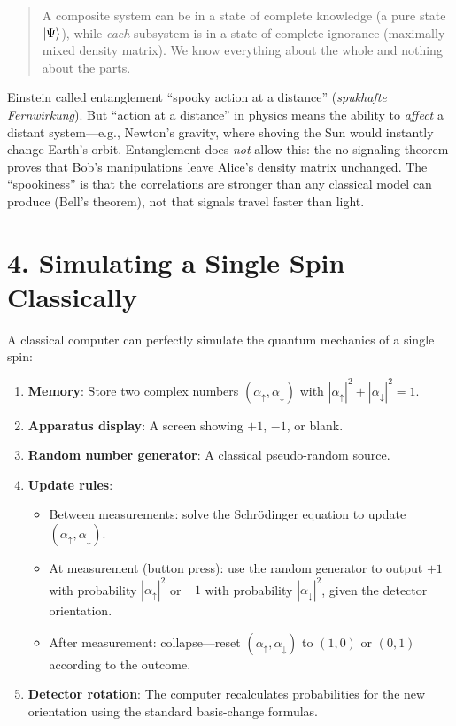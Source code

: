 \documentclass[12pt,a4paper]{article}
\begin{document}
\begin{quote}
A composite system can be in a state of complete knowledge (a pure state $\ket{\Psi}$), while \emph{each} subsystem is in a state of complete ignorance (maximally mixed density matrix).  We know everything about the whole and nothing about the parts.
\end{quote}

Einstein called entanglement ``spooky action at a distance'' (\textit{spukhafte Fernwirkung}).  But ``action at a distance'' in physics means the ability to \emph{affect} a distant system---e.g., Newton's gravity, where shoving the Sun would instantly change Earth's orbit.  Entanglement does \emph{not} allow this: the no-signaling theorem proves that Bob's manipulations leave Alice's density matrix unchanged.  The ``spookiness'' is that the correlations are stronger than any classical model can produce (Bell's theorem), not that signals travel faster than light.

\section{4. Simulating a Single Spin Classically}

A classical computer can perfectly simulate the quantum mechanics of a single spin:

\begin{enumerate}[nosep]
    \item \textbf{Memory}: Store two complex numbers $(\alpha_\uparrow, \alpha_\downarrow)$ with $|\alpha_\uparrow|^2+|\alpha_\downarrow|^2=1$.
    \item \textbf{Apparatus display}: A screen showing $+1$, $-1$, or blank.
    \item \textbf{Random number generator}: A classical pseudo-random source.
    \item \textbf{Update rules}:
    \begin{itemize}[nosep]
        \item Between measurements: solve the Schr\"{o}dinger equation to update $(\alpha_\uparrow,\alpha_\downarrow)$.
        \item At measurement (button press): use the random generator to output $+1$ with probability $|\alpha_\uparrow|^2$ or $-1$ with probability $|\alpha_\downarrow|^2$, given the detector orientation.
        \item After measurement: collapse---reset $(\alpha_\uparrow,\alpha_\downarrow)$ to $(1,0)$ or $(0,1)$ according to the outcome.
    \end{itemize}
    \item \textbf{Detector rotation}: The computer recalculates probabilities for the new orientation using the standard basis-change formulas.
\end{enumerate}
\end{document}
